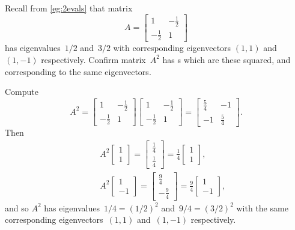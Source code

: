 \begin{example} \label{eg:2x2sympow}
Recall from \autoref{eg:2evals} that matrix 
\begin{equation*}
A=\begin{bmatrix} 1&-\frac12\\-\frac12&1 \end{bmatrix}
\end{equation*}
has eigenvalues~\(1/2\) and~\(3/2\) with corresponding eigenvectors \((1,1)\) and~\((1,-1)\) respectively.
Confirm matrix~\(A^2\) has s which are these squared, and corresponding to the same eigenvectors.
\begin{solution} 
Compute
\begin{equation*}
A^2=\begin{bmatrix} 1&-\frac12\\-\frac12&1 \end{bmatrix}
\begin{bmatrix} 1&-\frac12\\-\frac12&1 \end{bmatrix}
=\begin{bmatrix} \frac54&-1\\-1&\frac54 \end{bmatrix}.
\end{equation*}
Then
\begin{eqnarray*}
&&A^2\begin{bmatrix} 1\\1 \end{bmatrix}
=\begin{bmatrix} \frac14\\ \frac14 \end{bmatrix}
=\tfrac14\begin{bmatrix} 1\\1 \end{bmatrix},
\\&&A^2\begin{bmatrix} 1\\-1 \end{bmatrix}
=\begin{bmatrix} \frac94\\-\frac94 \end{bmatrix}
=\tfrac94\begin{bmatrix} 1\\-1 \end{bmatrix},
\end{eqnarray*}
and so \(A^2\) has eigenvalues~\(1/4=(1/2)^2\) and~\(9/4=(3/2)^2\) with the same corresponding eigenvectors~\((1,1)\) and~\((1,-1)\) respectively.
\end{solution}
\end{example}



